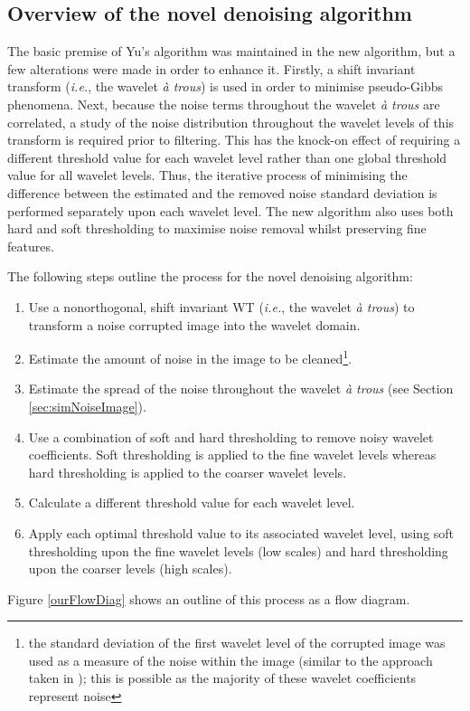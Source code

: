 \documentclass[12pt]{report}
\begin{document}
\subsection{Overview of the novel denoising algorithm}
\label{subsec:ourAlg}
The basic premise of Yu's algorithm was maintained in the new algorithm, but a few alterations were 
made in order to enhance it. Firstly, a shift invariant transform (\emph{i.e.}, the wavelet \emph{\`a trous}) is used 
in order to minimise pseudo-Gibbs phenomena. 
Next, because the noise terms throughout the wavelet \emph{\`a trous} are correlated, a study 
of the noise distribution throughout the wavelet levels of this transform is required prior to
filtering.
This has the knock-on effect of requiring a different threshold value for each wavelet level 
rather than one global threshold value for all wavelet levels.
Thus, the iterative process of minimising the difference between the estimated and the removed noise
standard deviation is performed separately upon each wavelet level.
The new algorithm also uses both hard and soft thresholding to maximise noise removal whilst preserving
fine features.

The following steps outline the process for the novel denoising algorithm:
\begin{enumerate}
	\item Use a nonorthogonal, shift invariant WT (\emph{i.e.}, the wavelet \emph{\`a trous})
	to transform a noise corrupted image into the wavelet domain.
	\item Estimate the amount of noise in the image to be 
	cleaned\footnote{the
	standard deviation of the first wavelet level of the corrupted image
	was used as a measure of the noise within the image (similar to the approach taken in \cite{guo});
	this is possible as the majority of these wavelet coefficients represent noise}.
	\item Estimate the spread of the noise throughout the wavelet \emph{\`a trous} (see Section \ref{sec:simNoiseImage}).
	\item Use a combination of soft and hard thresholding to remove noisy wavelet coefficients.
	Soft thresholding is applied to the fine wavelet levels whereas
	hard thresholding is applied to the coarser wavelet levels.
	\label{enum:softAndHard}
	\item Calculate a different threshold value for each wavelet level.
	\item Apply each optimal threshold value to its associated wavelet level, using soft thresholding
	upon the fine wavelet levels (low scales) and hard thresholding upon the coarser levels (high scales). 
\end{enumerate}
Figure \ref{ourFlowDiag} shows an outline of this process as a flow diagram. 
\end{document}
